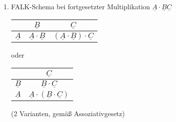 \begin{enumerate}
\item FALK-Schema bei fortgesetzter Multiplikation $\underline{A}\cdot \underline{B}\underline{C}$\\
\begin{tabular}{c | c | c}
 & $\underline{B}$ & $\underline{C}$\\
 \hline
$\underline{A}$ & $\underline{A}\cdot\underline{B}$ & $(\underline{A}\cdot\underline{B})\cdot \underline{C}$
\end{tabular} oder 
\begin{tabular}{c | c}
 & $\underline{C}$\\
\hline
$\underline{B}$ & $\underline{B}\cdot \underline{C}$\\
$\underline{A}$ & $\underline{A}\cdot (\underline{B}\cdot \underline{C})$\\
\end{tabular} (2 Varianten, gemäß Assoziativgesetz)
\end{enumerate}
